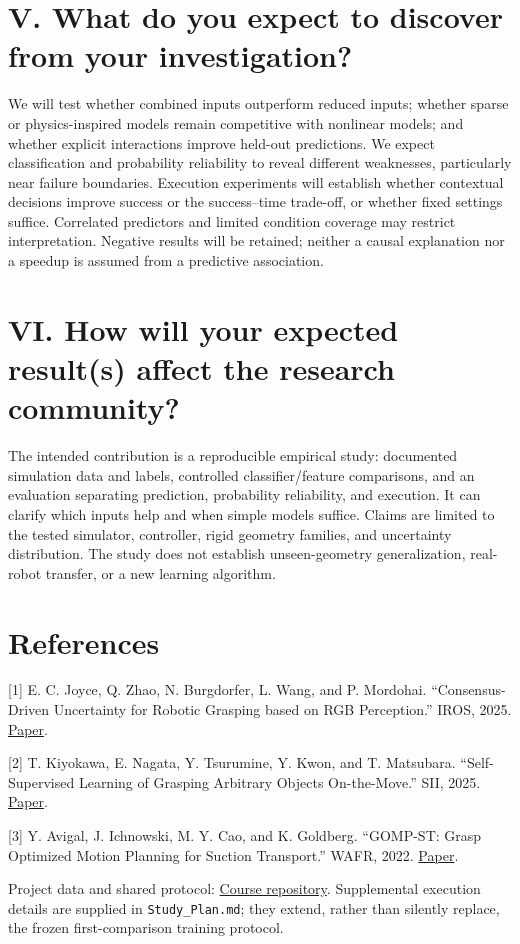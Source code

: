 \documentclass[11pt,letterpaper]{article}
\begin{document}
\section*{V. What do you expect to discover from your investigation?}

We will test whether combined inputs outperform reduced inputs; whether sparse or physics-inspired models remain competitive with nonlinear models; and whether explicit interactions improve held-out predictions. We expect classification and probability reliability to reveal different weaknesses, particularly near failure boundaries. Execution experiments will establish whether contextual decisions improve success or the success–time trade-off, or whether fixed settings suffice. Correlated predictors and limited condition coverage may restrict interpretation. Negative results will be retained; neither a causal explanation nor a speedup is assumed from a predictive association.

\section*{VI. How will your expected result(s) affect the research community?}

The intended contribution is a reproducible empirical study: documented simulation data and labels, controlled classifier/feature comparisons, and an evaluation separating prediction, probability reliability, and execution. It can clarify which inputs help and when simple models suffice. Claims are limited to the tested simulator, controller, rigid geometry families, and uncertainty distribution. The study does not establish unseen-geometry generalization, real-robot transfer, or a new learning algorithm.

\section*{References}

\begingroup\footnotesize

[1] E. C. Joyce, Q. Zhao, N. Burgdorfer, L. Wang, and P. Mordohai. “Consensus-Driven Uncertainty for Robotic Grasping based on RGB Perception.” IROS, 2025. \href{https://arxiv.org/abs/2506.20045}{Paper}.

[2] T. Kiyokawa, E. Nagata, Y. Tsurumine, Y. Kwon, and T. Matsubara. “Self-Supervised Learning of Grasping Arbitrary Objects On-the-Move.” SII, 2025. \href{https://arxiv.org/abs/2411.09904}{Paper}.

[3] Y. Avigal, J. Ichnowski, M. Y. Cao, and K. Goldberg. “GOMP-ST: Grasp Optimized Motion Planning for Suction Transport.” WAFR, 2022. \href{https://wafr2022.github.io/proceedings/WAFR_2022_Final_71.pdf}{Paper}.

Project data and shared protocol: \href{https://github.com/youseihuayu-wonderful/intelligent-grasping-course-project}{Course repository}. Supplemental execution details are supplied in \texttt{Study\_Plan.md}; they extend, rather than silently replace, the frozen first-comparison training protocol.

\endgroup
\end{document}
